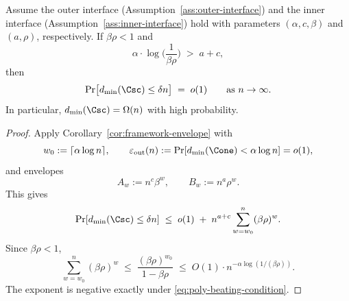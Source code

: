 \begin{corollary}
\label{cor:linear-dist-from-interfaces}
Assume the outer interface (Assumption~\ref{ass:outer-interface}) and the inner
interface (Assumption~\ref{ass:inner-interface}) hold with parameters
\((\alpha,c,\beta)\) and \((a,\rho)\), respectively.  If \(\beta\rho<1\) and
\begin{equation}
\label{eq:poly-beating-condition}
\alpha\cdot \log\Big(\frac{1}{\beta\rho}\Big) \;>\; a+c,
\end{equation}
then
\[
\Pr\bigl[d_{\min}(\Csc)\le \delta n\bigr] \;=\; o(1)
\qquad\text{as }n\to\infty.
\]
In particular, \(d_{\min}(\Csc)=\Omega(n)\) with high probability.
\end{corollary}

\begin{proof}
Apply Corollary~\ref{cor:framework-envelope} with
\[
w_0:=\lceil \alpha\log n\rceil,
\qquad
\varepsilon_{\mathrm{out}}(n):=\Pr[d_{\min}(\Cone)<\alpha\log n]=o(1),
\]
and envelopes
\[
A_w:=n^c\beta^w,
\qquad
B_w:=n^a\rho^w.
\]
This gives
\[
\Pr[d_{\min}(\Csc)\le \delta n]
\;\le\;
o(1)\;+\;n^{a+c}\sum_{w=w_0}^{n} (\beta\rho)^w.
\]
Since \(\beta\rho<1\),
\[
\sum_{w=w_0}^{n}(\beta\rho)^w
\;\le\;
\frac{(\beta\rho)^{w_0}}{1-\beta\rho}
\;\le\;
O(1)\cdot n^{-\alpha\log(1/(\beta\rho))}.
\]
The exponent is negative exactly under
\eqref{eq:poly-beating-condition}.
\end{proof}
